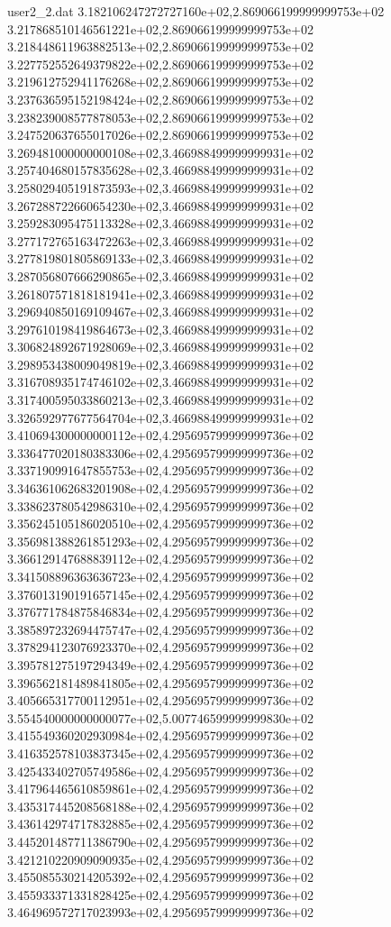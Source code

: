 \begin{filecontents}{user2_2.dat}
3.182106247272727160e+02,2.869066199999999753e+02
3.217868510146561221e+02,2.869066199999999753e+02
3.218448611963882513e+02,2.869066199999999753e+02
3.227752552649379822e+02,2.869066199999999753e+02
3.219612752941176268e+02,2.869066199999999753e+02
3.237636595152198424e+02,2.869066199999999753e+02
3.238239008577878053e+02,2.869066199999999753e+02
3.247520637655017026e+02,2.869066199999999753e+02
3.269481000000000108e+02,3.466988499999999931e+02
3.257404680157835628e+02,3.466988499999999931e+02
3.258029405191873593e+02,3.466988499999999931e+02
3.267288722660654230e+02,3.466988499999999931e+02
3.259283095475113328e+02,3.466988499999999931e+02
3.277172765163472263e+02,3.466988499999999931e+02
3.277819801805869133e+02,3.466988499999999931e+02
3.287056807666290865e+02,3.466988499999999931e+02
3.261807571818181941e+02,3.466988499999999931e+02
3.296940850169109467e+02,3.466988499999999931e+02
3.297610198419864673e+02,3.466988499999999931e+02
3.306824892671928069e+02,3.466988499999999931e+02
3.298953438009049819e+02,3.466988499999999931e+02
3.316708935174746102e+02,3.466988499999999931e+02
3.317400595033860213e+02,3.466988499999999931e+02
3.326592977677564704e+02,3.466988499999999931e+02
3.410694300000000112e+02,4.295695799999999736e+02
3.336477020180383306e+02,4.295695799999999736e+02
3.337190991647855753e+02,4.295695799999999736e+02
3.346361062683201908e+02,4.295695799999999736e+02
3.338623780542986310e+02,4.295695799999999736e+02
3.356245105186020510e+02,4.295695799999999736e+02
3.356981388261851293e+02,4.295695799999999736e+02
3.366129147688839112e+02,4.295695799999999736e+02
3.341508896363636723e+02,4.295695799999999736e+02
3.376013190191657145e+02,4.295695799999999736e+02
3.376771784875846834e+02,4.295695799999999736e+02
3.385897232694475747e+02,4.295695799999999736e+02
3.378294123076923370e+02,4.295695799999999736e+02
3.395781275197294349e+02,4.295695799999999736e+02
3.396562181489841805e+02,4.295695799999999736e+02
3.405665317700112951e+02,4.295695799999999736e+02
3.554540000000000077e+02,5.007746599999999830e+02
3.415549360202930984e+02,4.295695799999999736e+02
3.416352578103837345e+02,4.295695799999999736e+02
3.425433402705749586e+02,4.295695799999999736e+02
3.417964465610859861e+02,4.295695799999999736e+02
3.435317445208568188e+02,4.295695799999999736e+02
3.436142974717832885e+02,4.295695799999999736e+02
3.445201487711386790e+02,4.295695799999999736e+02
3.421210220909090935e+02,4.295695799999999736e+02
3.455085530214205392e+02,4.295695799999999736e+02
3.455933371331828425e+02,4.295695799999999736e+02
3.464969572717023993e+02,4.295695799999999736e+02

\end{filecontents}
